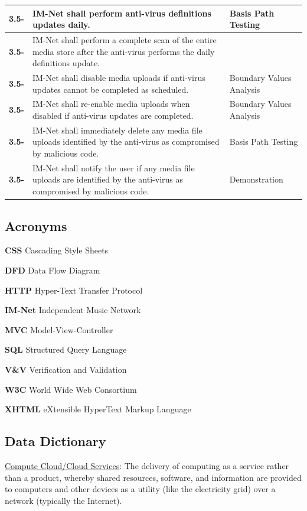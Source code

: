 \documentclass[letterpaper,12pt]{article}
\newcounter{rcounter}							%
\newcommand\rnumber{\stepcounter{rcounter}\arabic{rcounter}}
\newcommand{\Section}[1]{\section{#1} \setcounter{figure}{0}}
\begin{document}
{\begin{center}
\begin{tabular}{|l|p{4in}|p{2in}|}
\hline
\textbf{3.5-\rnumber} & IM-Net shall perform anti-virus definitions updates daily. & Basis Path Testing \\ 
\hline
\textbf{3.5-\rnumber} & IM-Net shall perform a complete scan of the entire media store after the anti-virus performs the daily definitions update. & \\ 
\hline
\textbf{3.5-\rnumber} & IM-Net shall disable media uploads if anti-virus updates cannot be completed as scheduled. & Boundary Values Analysis \\ 
\hline 
\textbf{3.5-\rnumber} & IM-Net shall re-enable media uploads when disabled if anti-virus updates are completed. & Boundary Values Analysis \\ 
\hline
\textbf{3.5-\rnumber} & IM-Net shall immediately delete any media file uploads identified by the anti-virus as compromised by malicious code. & Basis Path Testing \\ 
\hline
\textbf{3.5-\rnumber} & IM-Net shall notify the user if any media file uploads are identified by the anti-virus as compromised by malicious code. & Demonstration \\ 
\hline
\end{tabular} 
\end{center}

\eject 

\appendix

\textcolor{section}{\Section{Acronyms}}

\textbf{CSS} Cascading Style Sheets

\textbf{DFD} Data Flow Diagram

\textbf{HTTP} Hyper-Text Transfer Protocol

\textbf{IM-Net} Independent Music Network

\textbf{MVC} Model-View-Controller

\textbf{SQL} Structured Query Language

\textbf{V\&V} Verification and Validation

\textbf{W3C} World Wide Web Consortium

\textbf{XHTML} eXtensible HyperText Markup Language

\eject 
 
\textcolor{section}{\Section{Data Dictionary}}

\underline{Compute Cloud/Cloud Services}: The delivery of computing as a service rather than a product, whereby shared resources, software, and information are provided to computers and other devices as a utility (like the electricity grid) over a network (typically the Internet).

}
\end{document}
